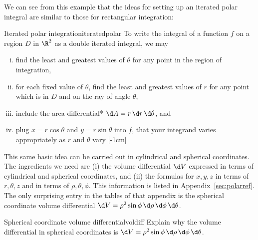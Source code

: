 \documentclass{watsonbook}
\begin{document}
We can see from this example that the ideas for setting up an iterated
polar integral are similar to those for 
rectangular integration:
\begin{obs}{Iterated polar integration}{iteratedpolar}
  To write the integral of a function $f$ on a region $D$ in $\R^2$
  as a double iterated integral, we may 
  \begin{enumerate}[(i), itemsep = 6pt, topsep = 5pt, leftmargin=12pt]
  \item find the least and greatest values of $\theta$ for any point in
    the region of integration, 
  \item for each fixed value of $\theta$, find the least and greatest
    values of $r$ for any point which is in $D$ and on the ray of angle
    $\theta$, 
  \item include the area differential* $\d A = r \, {\d}r \,
    \d\theta$, and 
  \item plug $x = r \cos\theta$ and $y=r\sin \theta$ into $f$, 
    that your integrand varies appropriately as $r$ and $\theta$ vary 
    [-1cm]
  \end{enumerate}
\end{obs}

This same basic idea can be carried out in cylindrical and spherical
coordinates. The ingredients we need are (i) the volume differential
$\d V$ expressed in terms of cylindrical and spherical coordinates, and
(ii) the formulas for $x, y, z$ in terms of $r, \theta, z$ and in
terms of $\rho, \theta, \phi$. This information is listed in
Appendix~\ref{sec:polarref}. The only surprising entry in the tables
of that appendix is the spherical coordinate volume differential $\d V =
\rho^2 \sin \phi \, {\d}\rho \, {\d} \phi \, \d\theta$.

\begin{example}{Spherical coordinate volume differential}{voldiff}
  Explain why the volume differential in spherical coordinates is $\d V =
  \rho^2 \sin \phi \, {\d}\rho \, {\d} \phi \, \d\theta$. 
\end{example}
\end{document}
